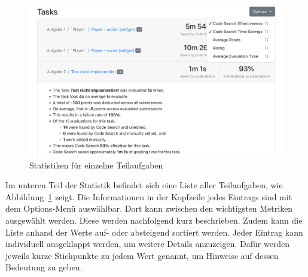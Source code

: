 \begin{figure}
    \centering
    \includegraphics[width=\textwidth]{images/assignment-statistics-tasks.png}
    \caption{Statistiken für einzelne Teilaufgaben}
    \label{fig:assignment-statistics-tasks}
\end{figure}

Im unteren Teil der Statistik befindet sich eine Liste aller Teilaufgaben, wie Abbildung~\ref{fig:assignment-statistics-tasks} zeigt.
Die Informationen in der Kopfzeile jedes Eintrags sind mit dem Options-Menü auswählbar.
Dort kann zwischen den wichtigsten Metriken ausgewählt werden.
Diese werden nachfolgend kurz beschrieben.
Zudem kann die Liste anhand der Werte auf- oder absteigend sortiert werden.
Jeder Eintrag kann individuell ausgeklappt werden, um weitere Details anzuzeigen.
Dafür werden jeweils kurze Stichpunkte zu jedem Wert genannt, um Hinweise auf dessen Bedeutung zu geben.

